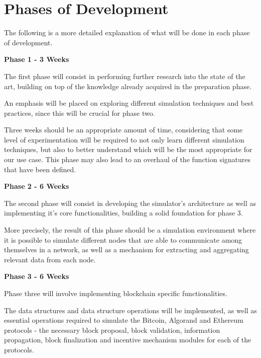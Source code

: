 \section{Phases of Development}

The following is a more detailed explanation of what will be done in each phase of development.

\vspace{0.5cm}

\textbf{Phase 1 - 3 Weeks}

The first phase will consist in performing further research into the state of the art, building on top of the knowledge already acquired in the preparation phase.

An emphasis will be placed on exploring different simulation techniques and best practices, since this will be crucial for phase two.

Three weeks should be an appropriate amount of time, considering that some level of experimentation will be required to not only learn different simulation techniques, but also to better understand which will be the most appropriate for our use case. This phase may also lead to an overhaul of the function signatures that have been defined.

\vspace{0.5cm}

\textbf{Phase 2 - 6 Weeks}

The second phase will consist in developing the simulator's architecture as well as implementing it's core functionalities, building a solid foundation for phase 3.

More precisely, the result of this phase should be a simulation environment where it is possible to simulate different nodes that are able to communicate among themselves in a network, as well as a mechanism for extracting and aggregating relevant data from each node.

\vspace{0.5cm}

\textbf{Phase 3 - 6 Weeks}

Phase three will involve implementing blockchain specific functionalities. 

The data structures and data structure operations will be implemented, as well as essential operations required to simulate the Bitcoin, Algorand and Ethereum protocols - the necessary block proposal, block validation, information propagation, block finalization and incentive mechanism modules for each of the protocols.

